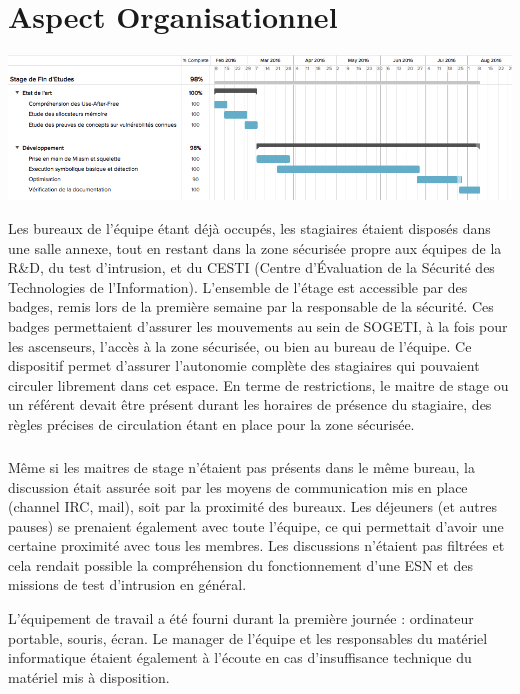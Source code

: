 \section*{Aspect Organisationnel}
\begin{center}
\includegraphics[scale=0.5]{gant.png}\newline
\end{center}

Les bureaux de l'équipe étant déjà occupés, les stagiaires étaient disposés dans une salle annexe, tout en restant dans la zone sécurisée propre aux équipes de
la R\&D, du test d'intrusion, et du CESTI (Centre d'Évaluation de la Sécurité des Technologies de l'Information). L'ensemble de l'étage est accessible par des badges, remis lors de la première semaine par la responsable de la
sécurité. Ces badges permettaient d'assurer les mouvements au sein de SOGETI, à la fois pour les ascenseurs, l'accès à la zone sécurisée, ou bien au bureau
de l'équipe. Ce dispositif permet d'assurer l'autonomie complète des stagiaires qui pouvaient circuler librement dans cet espace. En terme de restrictions,
le maitre de stage ou un référent devait être présent durant les horaires de présence du stagiaire, des règles précises de circulation étant en place pour la zone sécurisée.

\subparagraph{}
Même si les maitres de stage n'étaient pas présents dans le même bureau, la discussion était assurée soit par les moyens de communication mis en
place (channel IRC, mail), soit par la proximité des bureaux. Les déjeuners (et autres pauses) se prenaient également avec toute l'équipe, ce qui permettait
d'avoir une certaine proximité avec tous les membres. Les discussions n'étaient pas filtrées et cela rendait possible la compréhension du fonctionnement d'une
ESN et des missions de test d'intrusion en général.

L'équipement de travail a été fourni durant la première journée : ordinateur portable, souris, écran. Le manager de l'équipe et les responsables du matériel
informatique étaient également à l'écoute en cas d'insuffisance technique du matériel mis à disposition.


